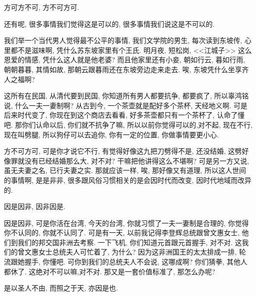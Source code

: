 \documentclass[11pt]{article}
\begin{document}
\begin{center}
	{\color{green} 方可方不可, 方不可方可.}
\end{center}

\vspace{-0.5cm}

还有呢, 很多事情我们觉得这是可以的, 很多事情我们说这是不可以的. 

我们举一个当代男人觉得最不公平的事情, 我们文学院的男生, 每次读到东坡传, 心里都不是滋味啊, 凭什么苏东坡家里有个王氏. 明月夜, 短松岗, <<江城子>> 这么恩爱的情感, 凭什么这人就是他老婆? 而且他家里还有小妾, 朝如行云, 暮如行雨, 朝朝暮暮, 其情如故, 那朝云跟暮雨还在东坡旁边走来走去. 唉, 东坡凭什么坐享齐人之福啊?

这所有在民国, 从清代要到民国, 你知道所有男人都要抗争, 都要疯了, 所以辜鸿铭说, 什么一夫一妻制啊? 从古到今, 一个茶壶就是配好多个茶杯, 天经地义啊. 可是后来时代变了, 你现在到这个商店去看看, 好多茶壶都只有一个茶杯了, 认命了懂吧. 那你们认命以后, 你们就不抗争了嘛, 所以以前你觉得可以的,对不起, 现在不行, 现在叫劈腿, 所以狗仔可以去追你, 你有一定的位置, 你做事情要更小心.

{\color{blue} 方不可方可}, 可是你才说它不行, 有觉得好像这九把刀劈得不是, 还没结婚, 这劈好像罪就没有已经结婚那么大, 对不对? 干嘛把他讲得这么不堪啊? 可是另一方又说, 虽无夫妻之名, 已行夫妻之实. 那就应该一样, 唉, 那好像又有道理, 所以这人世间的事情啊, 是是非非, 很多跟风俗习惯相关的是会因时代而改变, 因时代地域而改异的.


\begin{center}
	{\color{green} 因是因非, 因非因是.}
\end{center}

\vspace{-0.5cm}


{\color{blue} 因是因非}, 可是你活在台湾, 今天的台湾, 你就习惯了一夫一妻制是合理的, 你觉得你不认同的, 你就不认同了. 可是有一天, 以前我记得李登辉总统跟曾文惠女士, 他们到我们的邦交国非洲去考察. 一下飞机, 你们知道元首跟元首握手, 对不对. 这我们的曾文惠女士总统夫人可忙着了, 为什么? 因为这非洲国王的太太排成一排, 轮流跟她握手, 你懂吧. 可你到我们的总统夫人不会说, 这哪成啊? 你们猜拳, 其他人都休了. 这绝对不可以嘛,对不对. 那又是一套价值标准了, 那怎么办呢?

\newpage

\begin{center}
	{\color{green} 是以圣人不由, 而照之于天, 亦因是也.}
\end{center}

\vspace{-0.5cm}
\end{document}
